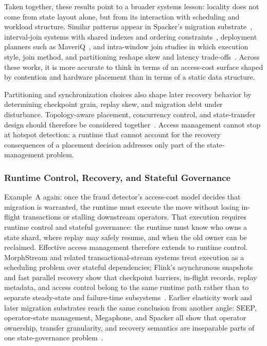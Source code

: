 \documentclass[manuscript,nonacm]{acmart}
\begin{document}
Taken together, these results point to a broader systems lesson: locality does not come from state layout alone, but from its interaction with scheduling and workload structure. Similar patterns appear in Spacker's migration substrate~\cite{mao2025spacker}, interval-join systems with shared indexes and ordering constraints~\cite{zhang2023openmldb}, deployment planners such as MaveriQ~\cite{liakopoulos2025maveriq}, and intra-window join studies in which execution style, join method, and partitioning reshape skew and latency trade-offs~\cite{zhang2021intrawindowjoin}. Across these works, it is more accurate to think in terms of an access-cost surface shaped by contention and hardware placement than in terms of a static data structure.

Partitioning and synchronization choices also shape later recovery behavior by determining checkpoint grain, replay skew, and migration debt under disturbance. Topology-aware placement, concurrency control, and state-transfer design should therefore be considered together~\cite{zhang2019briskstream,zhang2020concurrent,carbone2015asynchronous,zhao2024recovery,mao2025spacker}. Access management cannot stop at hotspot detection: a runtime that cannot account for the recovery consequences of a placement decision addresses only part of the state-management problem.

\subsubsection{Runtime Control, Recovery, and Stateful Governance}

Example~A again: once the fraud detector's access-cost model decides that migration is warranted, the runtime must execute the move without losing in-flight transactions or stalling downstream operators. That execution requires runtime control and stateful governance: the runtime must know who owns a state shard, where replay may safely resume, and when the old owner can be reclaimed. Effective access management therefore extends to runtime control. MorphStream and related transactional-stream systems treat execution as a scheduling problem over stateful dependencies; Flink's asynchronous snapshots and fast parallel recovery show that checkpoint barriers, in-flight records, replay metadata, and access control belong to the same runtime path rather than to separate steady-state and failure-time subsystems~\cite{mao2023morphstream,zhao2025morphstream,carbone2015asynchronous,zhao2024recovery}. Earlier elasticity work and later migration substrates reach the same conclusion from another angle: SEEP, operator-state management, Megaphone, and Spacker all show that operator ownership, transfer granularity, and recovery semantics are inseparable parts of one state-governance problem~\cite{fernandez2010seep,fernandez2013osm,nasir2019megaphone,mao2025spacker}.
\end{document}
